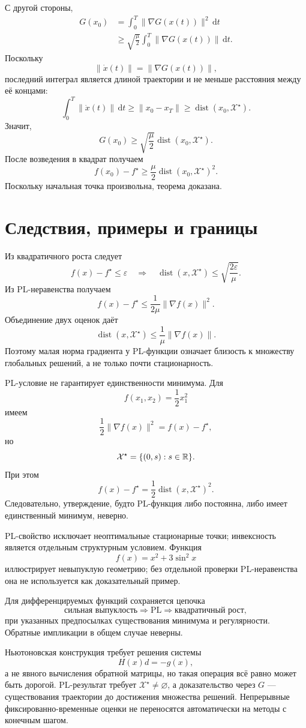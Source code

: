 С другой стороны,
\[
\begin{aligned}
    G(x_0)
    &=
    \int_0^T
    \lVert\nabla G(x(t))\rVert^2\,\mathrm dt
    \\
    &\ge
    \sqrt{\frac\mu2}
    \int_0^T
    \lVert\nabla G(x(t))\rVert\,\mathrm dt.
\end{aligned}
\]
Поскольку
\[
    \lVert\dot x(t)\rVert
    =
    \lVert\nabla G(x(t))\rVert,
\]
последний интеграл является длиной траектории и не меньше расстояния
между её концами:
\[
    \int_0^T
    \lVert\dot x(t)\rVert\,\mathrm dt
    \ge
    \lVert x_0-x_T\rVert
    \ge
    \operatorname{dist}(x_0,\mathcal X^\star).
\]
Значит,
\[
    G(x_0)
    \ge
    \sqrt{\frac\mu2}
    \operatorname{dist}(x_0,\mathcal X^\star).
\]
После возведения в квадрат получаем
\[
    f(x_0)-f^\star
    \ge
    \frac\mu2
    \operatorname{dist}(x_0,\mathcal X^\star)^2.
\]
Поскольку начальная точка произвольна, теорема доказана.

\section{Следствия, примеры и границы}

Из квадратичного роста следует
\[
    f(x)-f^\star\le\varepsilon
    \quad\Longrightarrow\quad
    \operatorname{dist}(x,\mathcal X^\star)
    \le
    \sqrt{\frac{2\varepsilon}{\mu}}.
\]
Из PL-неравенства получаем
\[
    f(x)-f^\star
    \le
    \frac1{2\mu}
    \lVert\nabla f(x)\rVert^2.
\]
Объединение двух оценок даёт
\[
    \operatorname{dist}(x,\mathcal X^\star)
    \le
    \frac1\mu
    \lVert\nabla f(x)\rVert.
\]
Поэтому малая норма градиента у PL-функции означает близость к
множеству глобальных решений, а не только почти стационарность.

PL-условие не гарантирует единственности минимума. Для
\[
    f(x_1,x_2)=\frac12x_1^2
\]
имеем
\[
    \frac12\lVert\nabla f(x)\rVert^2
    =
    f(x)-f^\star,
\]
но
\[
    \mathcal X^\star
    =
    \{(0,s):s\in\mathbb{R}\}.
\]
При этом
\[
    f(x)-f^\star
    =
    \frac12
    \operatorname{dist}(x,\mathcal X^\star)^2.
\]
Следовательно, утверждение, будто PL-функция либо постоянна, либо
имеет единственный минимум, неверно.

PL-свойство исключает неоптимальные стационарные точки; инвексность является отдельным структурным условием. Функция
\[
    f(x)=x^2+3\sin^2x
\]
иллюстрирует невыпуклую геометрию; без отдельной проверки PL-неравенства она не используется как доказательный пример.

Для дифференцируемых функций сохраняется цепочка
\[
    \text{сильная выпуклость}
    \Longrightarrow
    \text{PL}
    \Longrightarrow
    \text{квадратичный рост},
\]
при указанных предпосылках существования минимума и регулярности.
Обратные импликации в общем случае неверны.

Ньютоновская конструкция требует решения системы
\[
    H(x)d=-g(x),
\]
а не явного вычисления обратной матрицы, но такая операция всё равно
может быть дорогой. PL-результат требует
\(\mathcal X^\star\ne\varnothing\), а доказательство через \(G\) ---
существования траектории до достижения множества решений.
Непрерывные фиксированно-временные оценки не переносятся автоматически
на методы с конечным шагом.
